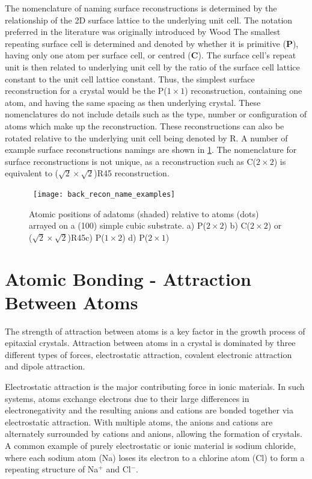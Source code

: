 The nomenclature of naming surface reconstructions is determined by the relationship of the 2D surface lattice to the underlying unit cell. The notation preferred in the literature was originally introduced by Wood\cite{Wood1964} The smallest repeating surface cell is determined and denoted by whether it is primitive (\textbf{P}), having only one atom per surface cell, or centred (\textbf{C}). The surface cell's repeat unit is then related to underlying unit cell by the ratio of the surface cell lattice constant to the unit cell lattice constant. Thus, the simplest surface reconstruction for a crystal would be the P($1 \times 1$) reconstruction, containing one atom, and having the same spacing as then underlying crystal. These nomenclatures do not include details such as the type, number or configuration of atoms which make up the reconstruction. These reconstructions can also be rotated relative to the underlying unit cell being denoted by R. A number of example surface reconstructions namings are shown in \cref{fig:back_recon_name_examples}. The nomenclature for surface reconstructions is not unique, as a reconstruction such as C($2\times2$) is equivalent to ($\sqrt{2}\times\sqrt{2}$)R45\degree{} reconstruction.
\begin{figure}
    \centering\
    \texttt{[image: back\_recon\_name\_examples]}
    \caption[Examples of surface reconstructions]{\label{fig:back_recon_name_examples} Atomic positions of adatoms (shaded) relative to atoms (dots) arrayed on a (100) simple cubic substrate. a) P($2 \times 2$) b) C($2 \times 2$) or ($\sqrt{2}\times\sqrt{2}$)R45\degree c) P($1 \times 2$) d) P($2 \times 1$)}
\end{figure}

\section{Atomic Bonding - Attraction Between Atoms}
The strength of attraction between atoms is a key factor in the growth process of epitaxial crystals. Attraction between atoms in a crystal is dominated by three different types of forces, electrostatic attraction, covalent electronic attraction and dipole attraction.

Electrostatic attraction is the major contributing force in ionic materials. In such systems, atoms exchange electrons due to their large differences in electronegativity and the resulting anions and cations are bonded together via electrostatic attraction. With multiple atoms, the anions and cations are alternately surrounded by cations and anions, allowing the formation of crystals. A common example of purely electrostatic or ionic material is sodium chloride, where each sodium atom (Na) loses its electron to a chlorine atom (Cl) to form a repeating structure of Na$^+$ and Cl$^-$.

